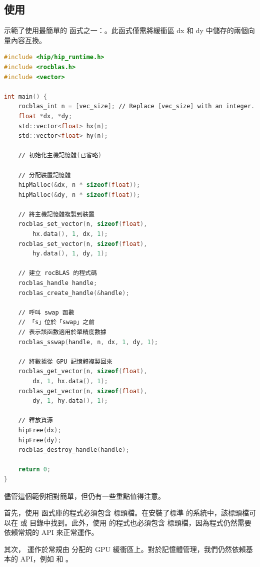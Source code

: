\subsection{使用 }
 示範了使用最簡單的  函式之一：。此函式僅需將緩衝區 dx 和 dy 中儲存的兩個向量內容互換。

\begin{lstlisting}[language=C, caption={\term{rocBLAS} 函式庫範例。為簡化起見，錯誤處理的程式碼已省略。}, captionpos=t, label={lst:rocBLAS}]
#include <hip∕hip_runtime.h>
#include <rocblas.h>
#include <vector>

int main() {
    rocblas_int n = [vec_size]; ∕∕ Replace [vec_size] with an integer.
    float *dx, *dy;
    std::vector<float> hx(n);
    std::vector<float> hy(n);

    ∕∕ 初始化主機記憶體(已省略)

    ∕∕ 分配裝置記憶體
    hipMalloc(&dx, n * sizeof(float));
    hipMalloc(&dy, n * sizeof(float));

    ∕∕ 將主機記憶體複製到裝置
    rocblas_set_vector(n, sizeof(float),
        hx.data(), 1, dx, 1);
    rocblas_set_vector(n, sizeof(float),
        hy.data(), 1, dy, 1);

    ∕∕ 建立 rocBLAS 的程式碼
    rocblas_handle handle;
    rocblas_create_handle(&handle);

    ∕∕ 呼叫 swap 函數
    ∕∕ 「s」位於「swap」之前
    ∕∕ 表示該函數適用於單精度數據
    rocblas_sswap(handle, n, dx, 1, dy, 1);

    ∕∕ 將數據從 GPU 記憶體複製回來
    rocblas_get_vector(n, sizeof(float),
        dx, 1, hx.data(), 1);
    rocblas_get_vector(n, sizeof(float),
        dy, 1, hy.data(), 1);

    ∕∕ 釋放資源
    hipFree(dx);
    hipFree(dy);
    rocblas_destroy_handle(handle);

    return 0;
}
\end{lstlisting}

儘管這個範例相對簡單，但仍有一些重點值得注意。

首先，使用  函式庫的程式必須包含  標頭檔。在安裝了標準  的系統中，該標頭檔可以在  或  目錄中找到。此外，使用  的程式也必須包含  標頭檔，因為程式仍然需要依賴常規的  API 來正常運作。

其次， 運作於常規由  分配的 GPU 緩衝區上。對於記憶體管理，我們仍然依賴基本的  API，例如  和 。

